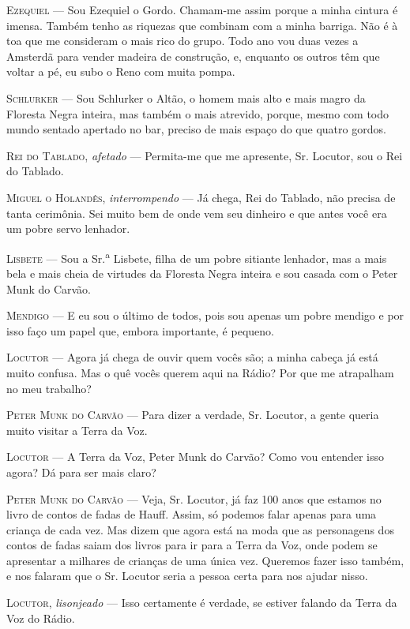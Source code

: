 \begin{myparindent}{0pt}
\begin{Parskip}
\textsc{Ezequiel} --- Sou Ezequiel o Gordo. Chamam-me assim porque a minha cintura
é imensa. Também tenho as riquezas que combinam com a minha barriga. Não
é à toa que me consideram o mais rico do grupo. Todo ano vou duas vezes
a Amsterdã para vender madeira de construção, e, enquanto os outros têm
que voltar a pé, eu subo o Reno com muita pompa.

\textsc{Schlurker} --- Sou Schlurker o Altão, o homem mais alto e mais magro da
Floresta Negra inteira, mas também o mais atrevido, porque, mesmo com
todo mundo sentado apertado no bar, preciso de mais espaço do que quatro
gordos.

\textsc{Rei do Tablado}, \emph{afetado} --- Permita-me que me apresente, Sr.
Locutor, sou o Rei do Tablado.

\textsc{Miguel o Holandês}, \emph{interrompendo} --- Já chega, Rei do Tablado, não
precisa de tanta cerimônia. Sei muito bem de onde vem seu dinheiro e que
antes você era um pobre servo lenhador.

\textsc{Lisbete} --- Sou a Sr.\textsuperscript{a} Lisbete, filha de um pobre
sitiante lenhador, mas a mais bela e mais cheia de virtudes da Floresta
Negra inteira e sou casada com o Peter Munk do Carvão.

\textsc{Mendigo} --- E eu sou o último de todos, pois sou apenas um pobre mendigo
e por isso faço um papel que, embora importante, é pequeno.

\textsc{Locutor} --- Agora já chega de ouvir quem vocês são; a minha cabeça já
está muito confusa. Mas o quê vocês querem aqui na Rádio? Por que me
atrapalham no meu trabalho?

\textsc{Peter Munk do Carvão} --- Para dizer a verdade, Sr. Locutor, a gente
queria muito visitar a Terra da Voz.

\textsc{Locutor} --- A Terra da Voz, Peter Munk do Carvão? Como vou entender isso
agora? Dá para ser mais claro?

\textsc{Peter Munk do Carvão} --- Veja, Sr. Locutor, já faz 100 anos que estamos
no livro de contos de fadas de Hauff. Assim, só podemos falar apenas
para uma criança de cada vez. Mas dizem que agora está na moda que as
personagens dos contos de fadas saiam dos livros para ir para a Terra da
Voz, onde podem se apresentar a milhares de crianças de uma única vez.
Queremos fazer isso também, e nos falaram que o Sr. Locutor seria a
pessoa certa para nos ajudar nisso.

\textsc{Locutor}, \emph{lisonjeado} --- Isso certamente é verdade, se estiver
falando da Terra da Voz do Rádio.


\end{Parskip}
\end{myparindent}
